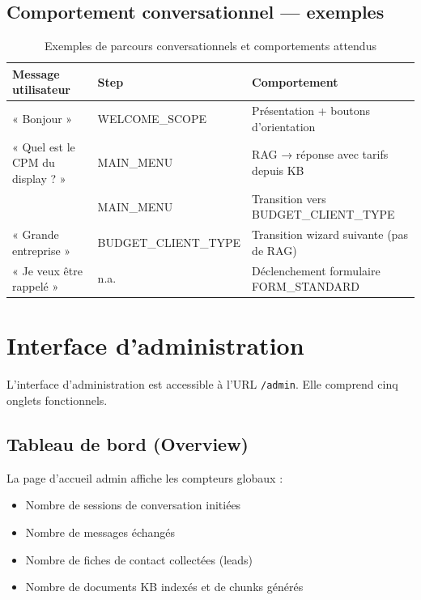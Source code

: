 \documentclass[12pt,a4paper]{report}
\begin{document}
\subsection{Comportement conversationnel — exemples}

\begin{table}[H]
\centering
\caption{Exemples de parcours conversationnels et comportements attendus}
\small
\begin{tabularx}{\textwidth}{|X|l|X|}
\hline
\rowcolor{tableheader}
\textbf{Message utilisateur} & \textbf{Step} & \textbf{Comportement} \\
\hline
« Bonjour » & WELCOME\_SCOPE & Présentation + boutons d'orientation \\
\hline
« Quel est le CPM du display ? » & MAIN\_MENU & RAG → réponse avec tarifs depuis KB \\
\hline
[Clic bouton Budget] & MAIN\_MENU & Transition vers BUDGET\_CLIENT\_TYPE \\
\hline
« Grande entreprise » & BUDGET\_CLIENT\_TYPE & Transition wizard suivante (pas de RAG) \\
\hline
« Je veux être rappelé » & n.a. & Déclenchement formulaire FORM\_STANDARD \\
\hline
\end{tabularx}
\label{tab:uc}
\end{table}

\section{Interface d'administration}

L'interface d'administration est accessible à l'URL \texttt{/admin}. Elle comprend
cinq onglets fonctionnels.

\subsection{Tableau de bord (Overview)}

La page d'accueil admin affiche les compteurs globaux :
\begin{itemize}
  \item Nombre de sessions de conversation initiées
  \item Nombre de messages échangés
  \item Nombre de fiches de contact collectées (leads)
  \item Nombre de documents KB indexés et de chunks générés
\end{itemize}
\end{document}
